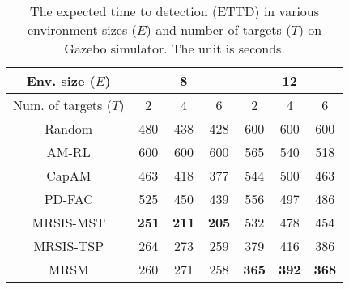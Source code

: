 \begin{table}[]
\centering
\caption{The expected time to detection (ETTD) in various environment sizes ($E$) and number of targets ($T$) on Gazebo simulator. The unit is seconds.}
\label{tab:ETTD}
\begin{tabular}{|c|ccc|ccc|}
\hline
Env. size ($E$) &
  \multicolumn{3}{c|}{8} &
  \multicolumn{3}{c|}{12} \\ \hline
Num. of targets ($T$) &
  \multicolumn{1}{c|}{2} &
  \multicolumn{1}{c|}{4} &
  6 &
  \multicolumn{1}{c|}{2} &
  \multicolumn{1}{c|}{4} &
  6 \\ \hline\hline
Random &
  \multicolumn{1}{c|}{480} &
  \multicolumn{1}{c|}{438} &
  428 &
  \multicolumn{1}{c|}{600} &
  \multicolumn{1}{c|}{600} &
  600 \\ \hline
AM-RL \cite{kool2018attention} &
  \multicolumn{1}{c|}{600} &
  \multicolumn{1}{c|}{600} &
  600 &
  \multicolumn{1}{c|}{565} &
  \multicolumn{1}{c|}{540} &
  518 \\ \hline
CapAM \cite{paull2022learning} &
  \multicolumn{1}{c|}{463} &
  \multicolumn{1}{c|}{418} &
  377 &
  \multicolumn{1}{c|}{544} &
  \multicolumn{1}{c|}{500} &
  463 \\ \hline
PD-FAC \cite{sheng2022pd} &
  \multicolumn{1}{c|}{525} &
  \multicolumn{1}{c|}{450} &
  439 &
  \multicolumn{1}{c|}{556} &
  \multicolumn{1}{c|}{497} &
  486 \\ \hline
MRSIS-MST\cite{li2024mrsis} &
  \multicolumn{1}{c|}{\textbf{251}} &
  \multicolumn{1}{c|}{\textbf{211}} &
  \textbf{205} &
  \multicolumn{1}{c|}{532} &
  \multicolumn{1}{c|}{478} &
  454 \\ \hline
MRSIS-TSP\cite{li2024mrsis} &
  \multicolumn{1}{c|}{264} &
  \multicolumn{1}{c|}{273} &
  259 &
  \multicolumn{1}{c|}{379} &
  \multicolumn{1}{c|}{416} &
  386 \\ \hline
MRSM &
  \multicolumn{1}{c|}{260} &
  \multicolumn{1}{c|}{271} &
  258 &
  \multicolumn{1}{c|}{\textbf{365}} &
  \multicolumn{1}{c|}{\textbf{392}} &
  \textbf{368} \\ \hline
\end{tabular}
\end{table}


